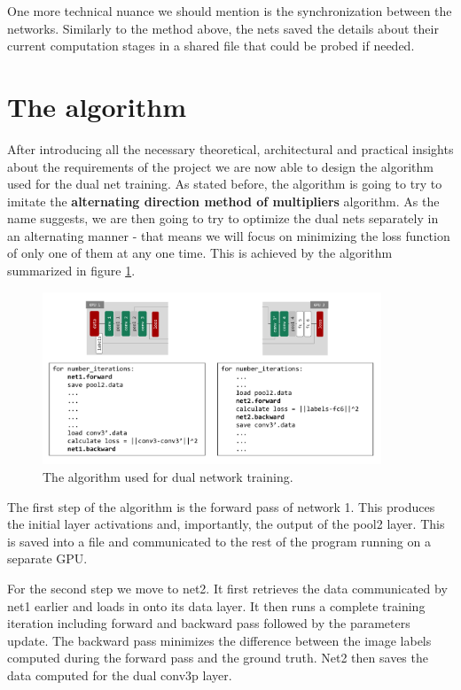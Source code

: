 \documentclass[a4paper, 12pt]{article}
\numberwithin{equation}{section}
\begin{document}
	One more technical nuance we should mention is the synchronization between the networks. Similarly to the method above, the nets saved the details about their current computation stages in a shared file that could be probed if needed.
	
	\section{The algorithm}
	
	After introducing all the necessary theoretical, architectural and practical insights about the requirements of the project we are now able to design the algorithm used for the dual net training. As stated before, the algorithm is going to try to imitate the \textbf{alternating direction method of multipliers} algorithm. As the name suggests, we are then going to try to optimize the dual nets separately in an alternating manner - that means we will focus on minimizing the loss function of only one of them at any one time. This is achieved by the algorithm summarized in figure \ref{fig:algorithm}.
	
	\begin{figure}[!h]
		\centering
		\includegraphics[page=1,width=0.9\textwidth]{algocode.pdf}
		\caption{\label{fig:algorithm}{The algorithm used for dual network training.}}
	\end{figure}
	
	The first step of the algorithm is the forward pass of network 1. This produces the initial layer activations and, importantly, the output of the pool2 layer. This is saved into a file and communicated to the rest of the program running on a separate GPU.
	
	For the second step we move to net2. It first retrieves the data communicated by net1 earlier and loads in onto its data layer. It then runs a complete training iteration including forward and backward pass followed by the parameters update. The backward pass minimizes the difference between the image labels computed during the forward pass and the ground truth. Net2 then saves the data computed for the dual conv3p layer.
	
\end{document}
